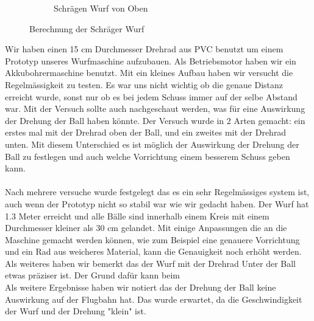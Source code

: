 \begin{figure}[h!]
\begin{subfigure}{.4\textwidth}
		\caption{Schrägen Wurf von Oben}
		\label{fig:Drehrad}
	\end{subfigure}
	\caption{Berechnung der Schräger Wurf}
	\label{Drehrad Versuch}
\end{figure}
Wir haben einen 15 cm Durchmesser Drehrad aus PVC benutzt um einem Prototyp unseres Wurfmaschine  aufzubauen. Als Betriebsmotor haben wir ein Akkubohrermaschine benutzt.
Mit ein kleines Aufbau haben wir versucht die Regelmässigkeit zu testen. Es war uns nicht wichtig ob die genaue Distanz erreicht wurde, sonst nur ob es bei jedem Schuss immer auf der selbe Abstand war. Mit der Versuch sollte auch nachgeschaut werden, was für eine Auswirkung der Drehung der Ball haben könnte. Der Versuch wurde in 2 Arten gemacht: ein erstes mal mit der Drehrad oben der Ball, und ein zweites mit der Drehrad unten. Mit diesem Unterschied es ist möglich der Auswirkung der Drehung der Ball zu festlegen und auch welche Vorrichtung einem besserem Schuss geben kann.\\ \\
Nach mehrere versuche wurde festgelegt das es ein sehr Regelmässiges system ist, auch wenn der Prototyp nicht so stabil war wie wir gedacht haben. Der Wurf hat 1.3 Meter erreicht und alle Bälle sind innerhalb einem Kreis mit einem Durchmesser kleiner als 30 cm gelandet. Mit einige Anpassungen die an die Maschine gemacht werden können, wie zum Beispiel eine genauere Vorrichtung und ein Rad aus weicheres Material, kann die Genauigkeit noch erhöht werden.\\ Als weiteres haben wir bemerkt das der Wurf mit der Drehrad Unter der Ball etwas präziser ist. Der Grund dafür kann beim  \\
Als weitere Ergebnisse haben wir notiert das der Drehung der Ball keine Auswirkung auf der Flugbahn hat. Das wurde erwartet, da die Geschwindigkeit der Wurf und der Drehung "klein" ist. \\

